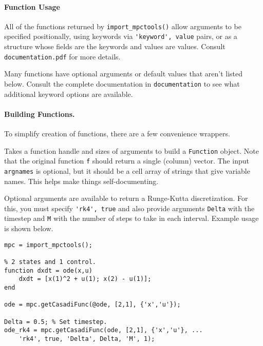 \documentclass{article}
\begin{document}
\begin{multicols}{2}
\paragraph*{Function Usage}

All of the functions returned by \lstinline|import_mpctools()| allow arguments to be specified positionally, using keywords via \lstinline|'keyword', value| pairs, or as a structure whose fields are the keywords and values are values.
Consult \texttt{documentation.pdf} for more details.

Many functions have optional arguments or default values that aren't listed below.
Consult the complete documentation in \texttt{documentation} to see what additional keyword options are available.

\paragraph*{Building \casadi{} Functions.}

To simplify creation of \casadi{} functions, there are a few convenience wrappers.


Takes a function handle and sizes of arguments to build a \casadi{} \texttt{Function} object.
Note that the original function \texttt{f} should return a single (column) vector.
The input \texttt{argnames} is optional, but it should be a cell array of strings that give variable names.
This helps make things self-documenting.

Optional arguments are available to return a Runge-Kutta discretization.
For this, you must specify \lstinline|'rk4', true| and also provide arguments \texttt{Delta} with the timestep and \texttt{M} with the number of steps to take in each interval.
Example usage is shown below.

\begin{lstlisting}[frame=L]
mpc = import_mpctools();

% 2 states and 1 control.
function dxdt = ode(x,u)
    dxdt = [x(1)^2 + u(1); x(2) - u(1)];
end

ode = mpc.getCasadiFunc(@ode, [2,1], {'x','u'});

Delta = 0.5; % Set timestep.
ode_rk4 = mpc.getCasadiFunc(ode, [2,1], {'x','u'}, ...
    'rk4', true, 'Delta', Delta, 'M', 1);
\end{lstlisting}



\end{multicols}
\end{document}
